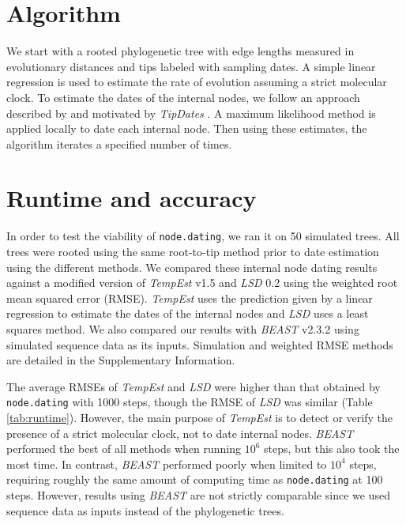 \documentclass{bioinfo}
\newcommand{\code}[1]{{\tt #1}}
\begin{document}
\section{Algorithm} \label{sec:alg}
We start with a rooted phylogenetic tree with edge lengths measured in evolutionary distances and tips labeled with sampling dates.
A simple linear regression is used to estimate the rate of evolution assuming a strict molecular clock.
To estimate the dates of the internal nodes, we follow an approach described by \cite{Felsenstein81} and motivated by \emph{TipDates} \citep{TipDates}.
A maximum likelihood method is applied locally to date each internal node.
Then using these estimates, the algorithm iterates a specified number of times.

\section{Runtime and accuracy} \label{sec:tests}
In order to test the viability of \code{node.dating}, we ran it on 50 simulated trees.
All trees were rooted using the same root-to-tip method prior to date estimation using the different methods.
We compared these internal node dating results against a modified version of \emph{TempEst} v1.5 and \emph{LSD} 0.2 using the weighted root mean squared error (RMSE).
\emph{TempEst} uses the prediction given by a linear regression to estimate the dates of the internal nodes and \emph{LSD} uses a least squares method.
We also compared our results with \emph{BEAST} v2.3.2 using simulated sequence data as its inputs.
Simulation and weighted RMSE methods are detailed in the Supplementary Information.

The average RMSEs of \emph{TempEst} and \emph{LSD} were higher than that obtained by \code{node.dating} with 1000 steps, though the RMSE of \emph{LSD} was similar (Table \ref{tab:runtime}).
However, the main purpose of \emph{TempEst} is to detect or verify the presence of a strict molecular clock, not to date internal nodes.
\emph{BEAST} performed the best of all methods when running $10^6$ steps, but this also took the most time.
In contrast, \emph{BEAST} performed poorly when limited to $10^4$ steps, requiring roughly the same amount of computing time as \code{node.dating} at 100 steps.
However, results using \emph{BEAST} are not strictly comparable since we used sequence data as inputs instead of the phylogenetic trees.
\end{document}
